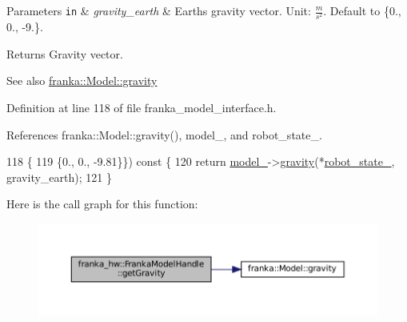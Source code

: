 \begin{DoxyParams}[1]{Parameters}
\mbox{\tt in}  & {\em gravity\+\_\+earth} & Earth\textquotesingle{}s gravity vector. Unit\+: $\frac{m}{s^2}$. Default to \{0., 0., -\/9.\}.\\
\hline
\end{DoxyParams}
\begin{DoxyReturn}{Returns}
Gravity vector.
\end{DoxyReturn}
\begin{DoxySeeAlso}{See also}
\hyperlink{classfranka_1_1Model_a9ebf2dbe37a78071fd74d2e552125cb4}{franka\+::\+Model\+::gravity} 
\end{DoxySeeAlso}


Definition at line 118 of file franka\+\_\+model\+\_\+interface.\+h.



References franka\+::\+Model\+::gravity(), model\+\_\+, and robot\+\_\+state\+\_\+.


\begin{DoxyCode}
118                                                                             \{
119                                        \{0., 0., -9.81\}\}) \textcolor{keyword}{const} \{
120     \textcolor{keywordflow}{return} \hyperlink{classfranka__hw_1_1FrankaModelHandle_a0c47e6c735f1bd809581b0498d53349b}{model\_}->\hyperlink{classfranka_1_1Model_a9ebf2dbe37a78071fd74d2e552125cb4}{gravity}(*\hyperlink{classfranka__hw_1_1FrankaModelHandle_a16192f263ce4709d99f557c6d8fabeb1}{robot\_state\_}, gravity\_earth);
121   \}
\end{DoxyCode}
Here is the call graph for this function\+:
\nopagebreak
\begin{figure}[H]
\begin{center}
\leavevmode
\includegraphics[width=350pt]{classfranka__hw_1_1FrankaModelHandle_ac6ad04268fd86d0442733000025c2230_cgraph}
\end{center}
\end{figure}
\mbox{\label{classfranka__hw_1_1FrankaModelHandle_a832505472a8e7bc9e12f26a57eb659f8}} 

